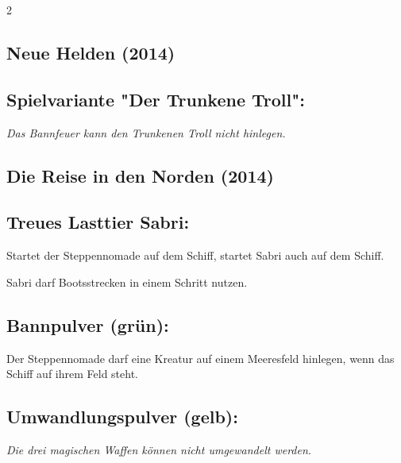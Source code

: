 \documentclass[10pt, a4paper, oneside]{book}
\newcommand{\fan}[1]{\textit{#1}}
\begin{document}
\begin{multicols*}{2}
\begin{bgcolor}
\end{bgcolor}




\begin{nobgcolor}
\section{Neue Helden (2014)}

\subsection{Spielvariante "Der Trunkene Troll":}

\fan{Das Bannfeuer kann den Trunkenen Troll nicht hinlegen.}

\end{nobgcolor}





\begin{bgcolor}
\section{Die Reise in den Norden (2014)}


\subsection{Treues Lasttier Sabri:}

Startet der Steppennomade auf dem Schiff, startet Sabri auch auf dem Schiff. 
\supercite{mh-begleitheft}

Sabri darf Bootsstrecken in einem Schritt nutzen.
\supercite{mh-begleitheft}


\subsection{Bannpulver (grün):}

Der Steppennomade darf eine Kreatur auf einem Meeresfeld hinlegen, wenn das Schiff auf ihrem Feld steht.
\supercite{mh-begleitheft}




\subsection{Umwandlungspulver (gelb):}

\fan{Die drei magischen Waffen können nicht umgewandelt werden.}




\end{bgcolor}
\end{multicols*}
\end{document}
